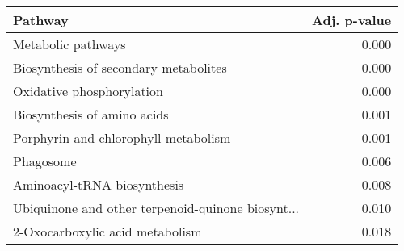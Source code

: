 \begin{tabular}{lr}
\toprule
                                           Pathway &  Adj. p-value \\
\midrule
                                Metabolic pathways &         0.000 \\
             Biosynthesis of secondary metabolites &         0.000 \\
                         Oxidative phosphorylation &         0.000 \\
                       Biosynthesis of amino acids &         0.001 \\
              Porphyrin and chlorophyll metabolism &         0.001 \\
                                         Phagosome &         0.006 \\
                       Aminoacyl-tRNA biosynthesis &         0.008 \\
 Ubiquinone and other terpenoid-quinone biosynt... &         0.010 \\
                   2-Oxocarboxylic acid metabolism &         0.018 \\
\bottomrule
\end{tabular}
